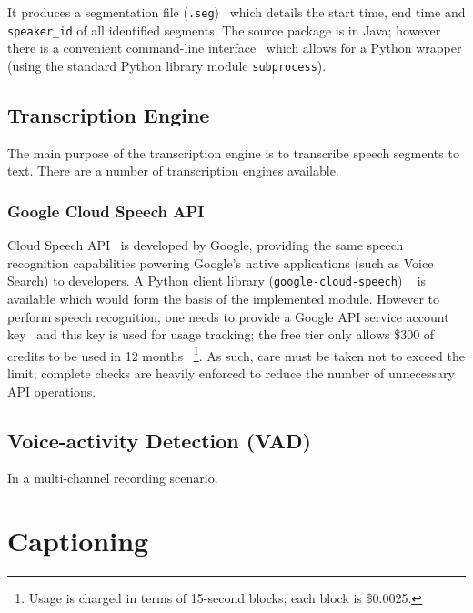 It produces a segmentation file 
(\texttt{.seg})~\cite{lium-seg} which details the start time, end time and
\texttt{speaker\_id} of all identified segments. The source package is in Java;
however there is a convenient command-line interface~\cite{lium} which allows
for a Python wrapper (using the standard Python library module
\texttt{subprocess}).

\subsection{Transcription Engine}

The main purpose of the transcription engine is to transcribe speech
segments to text. There are a number of transcription engines available.

\subsubsection{Google Cloud Speech API}

Cloud Speech API~\cite{gcs} is developed by Google, providing the same speech
recognition capabilities powering Google's native applications (such as Voice
Search) to developers. A Python client library (\texttt{google-cloud-speech})
~\cite{gh-gcs} is available which would form the basis of the implemented module.
However to perform speech recognition, one needs to provide a Google API service
account key~\cite{gcs-api-key} and this key is used for usage tracking; the free
tier only allows \$300 of credits to be used in 12 months~\cite{gcs-free}
\footnote{Usage is charged in terms of 15-second blocks; each block is \$0.0025.}.
As such, care must be taken not to exceed the limit; complete checks are heavily
enforced to reduce the number of unnecessary API operations.

\subsection{Voice-activity Detection (VAD)}

In a multi-channel recording scenario.

\section{Captioning}